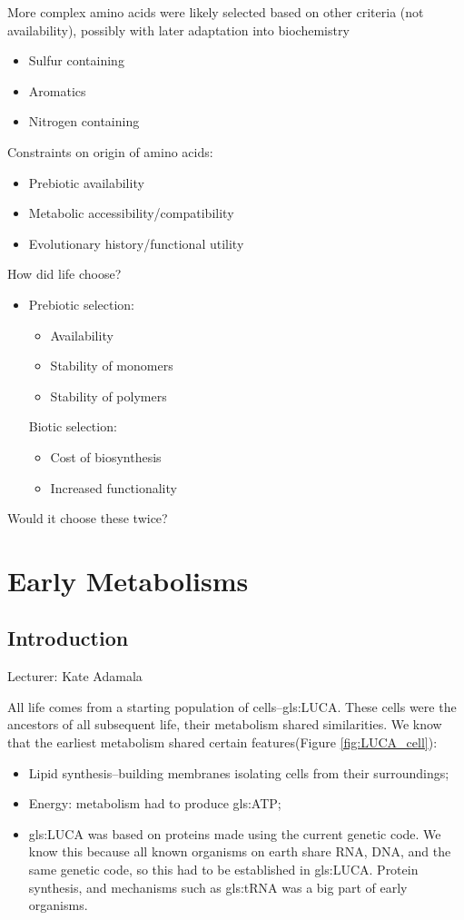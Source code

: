 \documentclass[]{article}
\begin{document}
 More complex amino acids were likely selected based on other criteria (not 
availability), possibly with later adaptation into biochemistry
\begin{itemize}
	\item  Sulfur containing
	\item Aromatics
	\item Nitrogen containing
\end{itemize}
Constraints on origin of amino acids:

\begin{itemize}
	\item  Prebiotic availability
	\item  Metabolic accessibility/compatibility
	\item  Evolutionary history/functional utility
\end{itemize}

How did life choose?

\begin{itemize}
	\item Prebiotic selection:
	\begin{itemize}
		\item 	Availability
		\item Stability of monomers
		\item Stability of polymers
	\end{itemize}
	Biotic selection:
	\begin{itemize}
		\item 	Cost of biosynthesis
		\item Increased functionality
	\end{itemize}
\end{itemize}
Would it choose these twice?

\section{Early Metabolisms}

\subsection{Introduction}

Lecturer: Kate Adamala

All life comes from a starting population of cells--\gls{gls:LUCA}. These cells were the ancestors of all subsequent life, their metabolism shared similarities. We know that the earliest metabolism shared certain features(Figure \ref {fig:LUCA_cell}):
\begin{itemize}
	\item Lipid synthesis--building membranes isolating cells from their surroundings;
	\item Energy: metabolism had to produce \gls{gls:ATP};
	\item \gls{gls:LUCA} was based on proteins made using the current genetic code. We know this because all known organisms on earth share RNA, DNA, and the same genetic code, so this had to be established in \gls{gls:LUCA}. Protein synthesis, and mechanisms such as \gls{gls:tRNA} was a big part of early organisms. 
\end{itemize}
\end{document}
